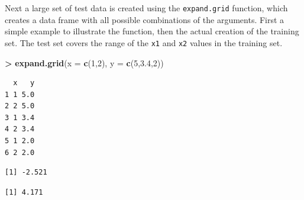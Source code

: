 \documentclass[
]{krantz}
\makeatletter
\newenvironment{Shaded}{\begin{snugshade}}{\end{snugshade}}
\newcommand{\DataTypeTok}[1]{\textcolor[rgb]{0.27,0.27,0.27}{#1}}
\newcommand{\DecValTok}[1]{\textcolor[rgb]{0.06,0.06,0.06}{#1}}
\newcommand{\FloatTok}[1]{\textcolor[rgb]{0.06,0.06,0.06}{#1}}
\newcommand{\KeywordTok}[1]{\textcolor[rgb]{0.27,0.27,0.27}{\textbf{#1}}}
\newcommand{\NormalTok}[1]{#1}
\newcommand{\OperatorTok}[1]{\textcolor[rgb]{0.43,0.43,0.43}{\textbf{#1}}}
\newcommand{\StringTok}[1]{\textcolor[rgb]{0.5,0.5,0.5}{#1}}
\newenvironment{kframe}{%
\medskip{}
\setlength{\fboxsep}{.8em}
 \def\at@end@of@kframe{}%
 \ifinner\ifhmode%
  \def\at@end@of@kframe{\end{minipage}}%
  \begin{minipage}{\columnwidth}%
 \fi\fi%
 \def\FrameCommand##1{\hskip\@totalleftmargin \hskip-\fboxsep
 \colorbox{shadecolor}{##1}\hskip-\fboxsep
     \hskip-\linewidth \hskip-\@totalleftmargin \hskip\columnwidth}%
 \MakeFramed {\advance\hsize-\width
   \@totalleftmargin\z@ \linewidth\hsize
   \@setminipage}}%
 {\par\unskip\endMakeFramed%
 \at@end@of@kframe}
\renewenvironment{Shaded}{\begin{kframe}}{\end{kframe}}
\makeatother
\begin{document}
Next a large set of test data is created using the \texttt{expand.grid} function, which creates a data frame with all possible combinations of the arguments. First a simple example to illustrate the function, then the actual creation of the training set. The test set covers the range of the \texttt{x1} and \texttt{x2} values in the training set.

\begin{Shaded}
\begin{Highlighting}[]
\OperatorTok{\textgreater{}}\StringTok{ }\KeywordTok{expand.grid}\NormalTok{(}\DataTypeTok{x =} \KeywordTok{c}\NormalTok{(}\DecValTok{1}\NormalTok{,}\DecValTok{2}\NormalTok{), }\DataTypeTok{y =} \KeywordTok{c}\NormalTok{(}\DecValTok{5}\NormalTok{,}\FloatTok{3.4}\NormalTok{,}\DecValTok{2}\NormalTok{))}
\end{Highlighting}
\end{Shaded}

\begin{verbatim}
  x   y
1 1 5.0
2 2 5.0
3 1 3.4
4 2 3.4
5 1 2.0
6 2 2.0
\end{verbatim}

\begin{Shaded}
\end{Shaded}

\begin{verbatim}
[1] -2.521
\end{verbatim}

\begin{Shaded}
\end{Shaded}

\begin{verbatim}
[1] 4.171
\end{verbatim}

\begin{Shaded}
\end{Shaded}
\end{document}
